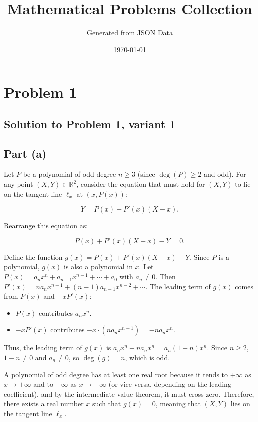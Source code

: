 \documentclass[12pt,a4paper]{article}
\title{Mathematical Problems Collection}
\author{Generated from JSON Data}
\date{\today}
\theoremstyle{definition}
\begin{document}
    \maketitle
    \tableofcontents
    \newpage
\section{Problem 1}

\subsection{Solution to Problem 1, variant 1}

\subsection*{Part (a)}

Let $P$ be a polynomial of odd degree $n \geq 3$ (since $\deg(P) \geq 2$ and odd). For any point $(X, Y) \in \mathbb{R}^2$, consider the equation that must hold for $(X, Y)$ to lie on the tangent line $\ell_x$ at $(x, P(x))$:

\[
Y = P(x) + P'(x)(X - x).
\]

Rearrange this equation as:

\[
P(x) + P'(x)(X - x) - Y = 0.
\]

Define the function $g(x) = P(x) + P'(x)(X - x) - Y$. Since $P$ is a polynomial, $g(x)$ is also a polynomial in $x$. Let $P(x) = a_n x^n + a_{n-1} x^{n-1} + \cdots + a_0$ with $a_n \neq 0$. Then $P'(x) = n a_n x^{n-1} + (n-1) a_{n-1} x^{n-2} + \cdots$. The leading term of $g(x)$ comes from $P(x)$ and $-x P'(x)$:

\begin{itemize}
\item $P(x)$ contributes $a_n x^n$.
\item $-x P'(x)$ contributes $-x \cdot (n a_n x^{n-1}) = -n a_n x^n$.
\end{itemize}

Thus, the leading term of $g(x)$ is $a_n x^n - n a_n x^n = a_n (1 - n) x^n$. Since $n \geq 2$, $1 - n \neq 0$ and $a_n \neq 0$, so $\deg(g) = n$, which is odd.

A polynomial of odd degree has at least one real root because it tends to $+\infty$ as $x \to +\infty$ and to $-\infty$ as $x \to -\infty$ (or vice-versa, depending on the leading coefficient), and by the intermediate value theorem, it must cross zero. Therefore, there exists a real number $x$ such that $g(x) = 0$, meaning that $(X, Y)$ lies on the tangent line $\ell_x$.
\end{document}
